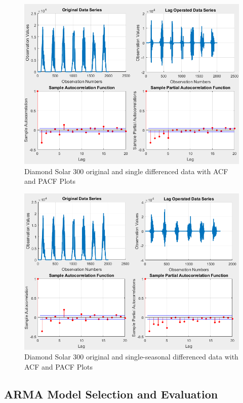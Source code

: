 \documentclass[journal]{IEEEtran}
\begin{document}
\begin{figure}[htpb]
	\centering
	\includegraphics[scale=0.4]{SingleLag_5Min_Diamond300.png}
	\caption{Diamond Solar 300 original and single differenced data with ACF and PACF Plots}
	\label{fig10} %
\end{figure}

\begin{figure}[htpb]
	\centering
	\includegraphics[scale=0.4]{SingleSeasonalLag_5Min_Diamond300.png}
	\caption{Diamond Solar 300 original and single-seasonal differenced data with ACF and PACF Plots}
	\label{fig11} %
\end{figure}

\subsection{ARMA Model Selection and Evaluation}
\end{document}
